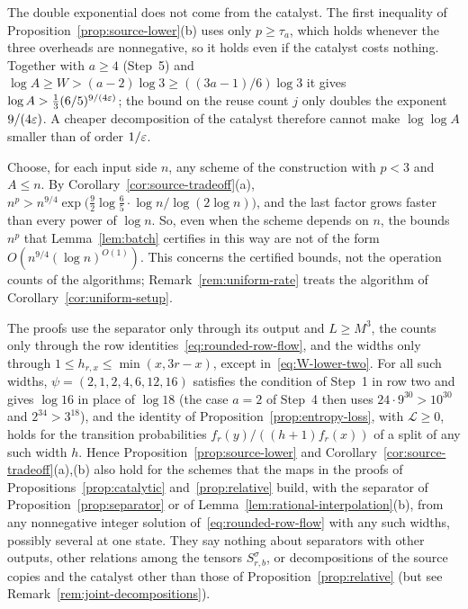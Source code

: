 The double exponential does not come from the catalyst. The first
inequality of Proposition~\ref{prop:source-lower}(b) uses only
\(p\ge\tau_a\), which holds whenever the three overheads are
nonnegative, so it holds even if the catalyst costs nothing. Together
with \(a\ge4\) (Step~5) and
\(\log A\ge W>(a-2)\log3\ge((3a-1)/6)\log3\) it gives
\(\log A>\frac13(6/5)^{9/(4\varepsilon)}\); the bound on the reuse count \(j\)
only doubles the exponent \(9/(4\varepsilon)\). A cheaper decomposition of the
catalyst therefore cannot make \(\log\log A\) smaller than of order
\(1/\varepsilon\).

\begin{remark}
\label{rem:certificate-limit}
Choose, for each input side \(n\), any scheme of the construction with
\(p<3\) and \(A\le n\). By Corollary~\ref{cor:source-tradeoff}(a),
\(n^p>n^{9/4}\exp\bigl(\tfrac92\log\tfrac65\cdot\log n/\log(2\log n)\bigr)\),
and the last factor grows faster than every power of \(\log n\). So,
even when the scheme depends on \(n\), the bounds \(n^p\) that
Lemma~\ref{lem:batch} certifies in this way are not of the form
\(O(n^{9/4}(\log n)^{O(1)})\). This concerns the certified bounds, not
the operation counts of the algorithms; Remark~\ref{rem:uniform-rate}
treats the algorithm of Corollary~\ref{cor:uniform-setup}.
\end{remark}

\begin{remark}\label{rem:limits-scope}
The proofs use the separator only through its output and \(L\ge M^3\),
the counts only through the row identities~\eqref{eq:rounded-row-flow},
and the widths only through \(1\le h_{r,x}\le\min(x,3r-x)\), except
in~\eqref{eq:W-lower-two}. For all such widths,
\(\psi=(2,1,2,4,6,12,16)\) satisfies the condition of Step~1 in row two
and gives \(\log16\) in place of \(\log18\) (the case \(a=2\) of Step~4
then uses \(24\cdot9^{30}>10^{30}\) and \(2^{34}>3^{18}\)), and the
identity of Proposition~\ref{prop:entropy-loss}, with \(\mathcal L\ge0\),
holds for the transition probabilities \(f_r(y)/((h+1)f_r(x))\) of a
split of any such width \(h\). Hence Proposition~\ref{prop:source-lower}
and Corollary~\ref{cor:source-tradeoff}(a),(b) also hold for the schemes
that the maps in the proofs of Propositions~\ref{prop:catalytic}
and~\ref{prop:relative} build, with the separator of
Proposition~\ref{prop:separator} or of
Lemma~\ref{lem:rational-interpolation}(b), from any
nonnegative integer solution of~\eqref{eq:rounded-row-flow} with any
such widths, possibly several at one state. They say nothing about
separators with other outputs, other relations among the tensors
\(S^\sigma_{r,b}\), or decompositions of the source copies and the
catalyst other than those of Proposition~\ref{prop:relative} (but see
Remark~\ref{rem:joint-decompositions}).
\end{remark}

